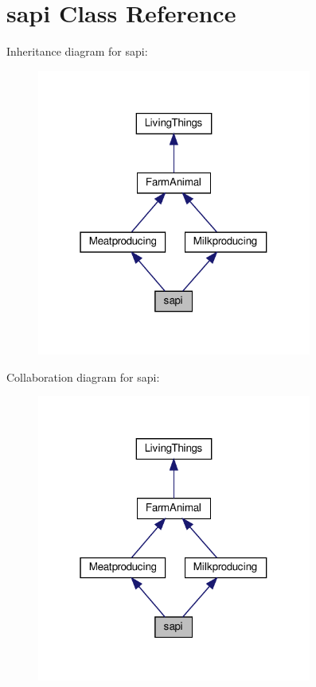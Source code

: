 \hypertarget{classsapi}{}\section{sapi Class Reference}
\label{classsapi}


Inheritance diagram for sapi\+:
\nopagebreak
\begin{figure}[H]
\begin{center}
\leavevmode
\includegraphics[width=256pt]{classsapi__inherit__graph}
\end{center}
\end{figure}


Collaboration diagram for sapi\+:
\nopagebreak
\begin{figure}[H]
\begin{center}
\leavevmode
\includegraphics[width=256pt]{classsapi__coll__graph}
\end{center}
\end{figure}
